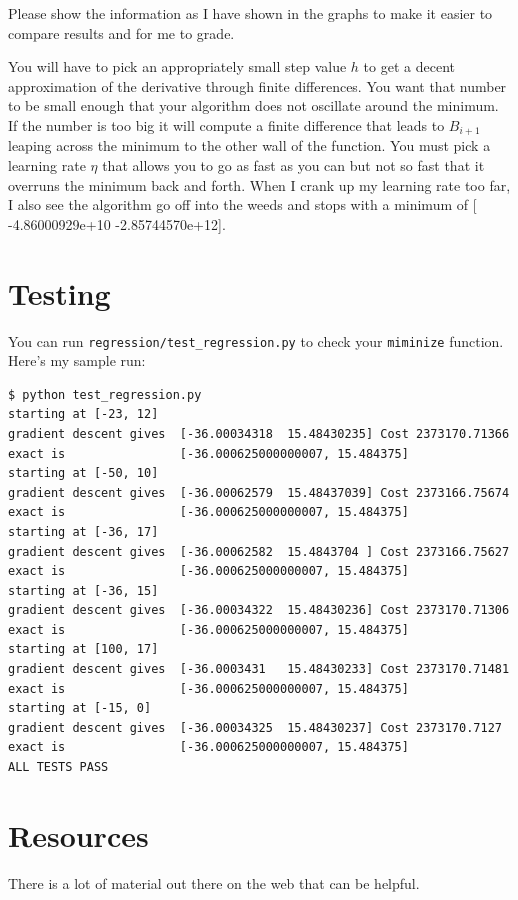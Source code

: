 \documentclass[titlepage]{tufte-book}
\begin{document}
\begin{fullwidth}
Please show the information as I have shown in the graphs to make it easier to compare results and for me to grade. 

You will have to pick an appropriately small step value $h$ to get a decent approximation of the derivative through finite differences. You want that number to be small enough that your algorithm does not oscillate around the minimum. If the number is too big it will compute a finite difference that leads to $B_{i+1}$ leaping across the minimum to the other wall of the function. You must pick a learning rate $\eta$ that allows you to go as fast as you can but not so fast that it overruns the minimum back and forth. When I crank up my learning rate too far, I also see the algorithm go off into the weeds and stops with a minimum of [ -4.86000929e+10  -2.85744570e+12].

\section{Testing}

You can run {\tt regression/test\_regression.py} to check your {\tt miminize} function.  Here's my sample run:

\begin{lstlisting}[style=BashInputStyle]
$ python test_regression.py
starting at [-23, 12]
gradient descent gives  [-36.00034318  15.48430235] Cost 2373170.71366
exact is                [-36.000625000000007, 15.484375]
starting at [-50, 10]
gradient descent gives  [-36.00062579  15.48437039] Cost 2373166.75674
exact is                [-36.000625000000007, 15.484375]
starting at [-36, 17]
gradient descent gives  [-36.00062582  15.4843704 ] Cost 2373166.75627
exact is                [-36.000625000000007, 15.484375]
starting at [-36, 15]
gradient descent gives  [-36.00034322  15.48430236] Cost 2373170.71306
exact is                [-36.000625000000007, 15.484375]
starting at [100, 17]
gradient descent gives  [-36.0003431   15.48430233] Cost 2373170.71481
exact is                [-36.000625000000007, 15.484375]
starting at [-15, 0]
gradient descent gives  [-36.00034325  15.48430237] Cost 2373170.7127
exact is                [-36.000625000000007, 15.484375]
ALL TESTS PASS
\end{lstlisting}

\section{Resources}

There is a lot of material out there on the web that can be helpful.


\end{fullwidth}
\end{document}

